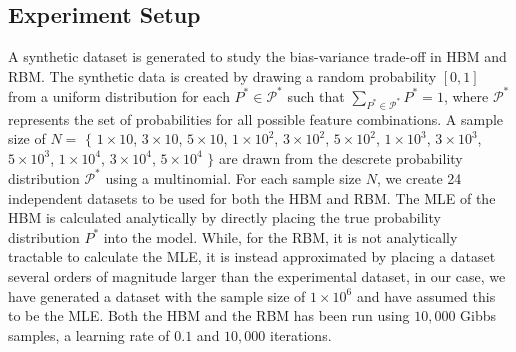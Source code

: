 \documentclass[letterpaper]{article} %
\begin{document}
	\subsection{Experiment Setup}
		A synthetic dataset is generated to study the bias-variance trade-off in HBM and RBM. The synthetic data is created by drawing a random probability $\left[ 0, 1 \right]$ from a uniform distribution for each $P^{*} \in \mathcal{P}^{*}$ such that $\sum_{P^{*} \in \mathcal{P}^{*}} P^{*} = 1$, where $\mathcal{P}^{*}$ represents the set of probabilities for all possible feature combinations. A sample size of $N =$ $\{$ $1 \times 10$, $3 \times 10$, $5 \times 10$, $1 \times 10^2$, $3 \times 10^2$, $5 \times 10^2$, $1 \times 10^3$, $3 \times 10^3$, $5 \times 10^3$, $1 \times 10^4$, $3 \times 10^4$, $5 \times 10^4$ $\}$ are drawn from the descrete probability distribution $\mathcal{P}^{*}$ using a multinomial. For each sample size $N$, we create 24 independent datasets to be used for both the HBM and RBM. The MLE of the HBM is calculated analytically by directly placing the true probability distribution $P^{*}$ into the model. While, for the RBM, it is not analytically tractable to calculate the MLE, it is instead approximated by placing a dataset several orders of magnitude larger than the experimental dataset, in our case, we have generated a dataset with the sample size of $1 \times 10^6$ and have assumed this to be the MLE. Both the HBM and the RBM has been run using $10,000$ Gibbs samples, a learning rate of $0.1$ and $10,000$ iterations.
\end{document}
